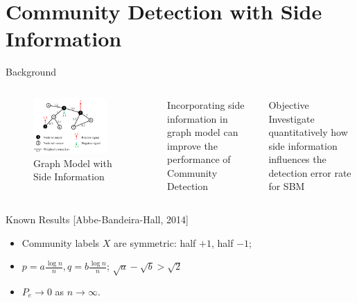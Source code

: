 \documentclass[notheorems]{beamer}
\begin{document}
\section[Side Information]{Community Detection with Side Information}
\begin{frame}
	\tableofcontents[currentsection]
\end{frame}
\begin{frame}{Background}
	\begin{columns}
	\begin{figure}
		\includegraphics[width=0.8\textwidth]{si.png}
		\caption{\scriptsize Graph Model with Side Information}
	\end{figure}
	Incorporating side information in graph model
	can improve the performance of Community Detection
	\begin{block}{Objective}
		Investigate quantitatively how side information influences
		the detection error rate for SBM
	\end{block}
	\end{columns}
	\begin{block}{Known Results [Abbe-Bandeira-Hall, 2014]}
		\begin{itemize}
		\item Community labels $X$ are symmetric: half $+1$, half $-1$;
		\item $p = a\frac{ \log n}{n}, q = b \frac{ \log n}{n}$;
		$\sqrt{a} - \sqrt{b} > \sqrt{2}$
		\item $P_e \to 0$ as $n \to \infty$.
		\end{itemize}
	\end{block}
\end{frame}
\end{document}
